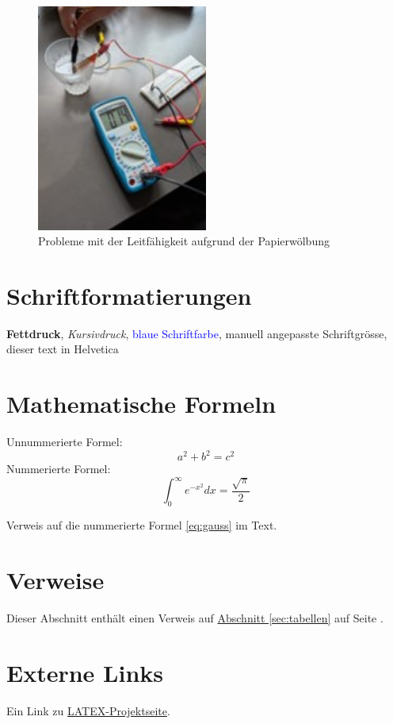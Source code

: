 \documentclass[a4paper,12pt]{article}
\begin{document}
\begin{figure}[h!]
\centering
\includegraphics[width=0.5\textwidth]{Bild6}
\caption{Probleme mit der Leitfähigkeit aufgrund der Papierwölbung}
\label{fig:bild6}
\end{figure}



\section{Schriftformatierungen}
\textbf{Fettdruck}, \textit{Kursivdruck}, \textcolor{blue}{blaue Schriftfarbe}, \Large manuell angepasste Schriftgrösse, \textsf{dieser text in Helvetica}

\section{Mathematische Formeln}
Unnummerierte Formel:
\[
a^2 + b^2 = c^2
\]
Nummerierte Formel:
\begin{equation}
\int_{0}^{\infty} e^{-x^2} dx = \frac{\sqrt{\pi}}{2}
\label{eq:gauss}
\end{equation}

Verweis auf die nummerierte Formel \eqref{eq:gauss} im Text.

\section{Verweise}
Dieser Abschnitt enthält einen Verweis auf \hyperref[sec:tabellen]{Abschnitt \ref*{sec:tabellen}} auf Seite \pageref{sec:tabellen}.

\section{Externe Links}
Ein Link zu \href{https://www.latex-project.org}{LATEX-Projektseite}.
\end{document}
